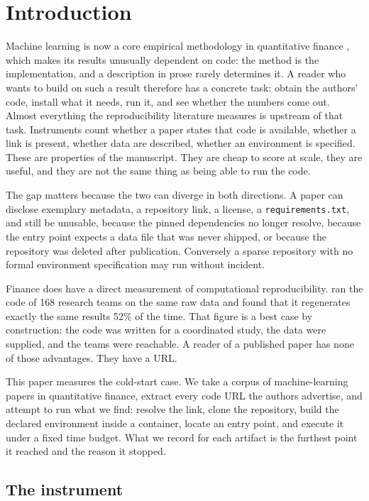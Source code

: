 \section{Introduction}\label{sec:intro}

Machine learning is now a core empirical methodology in quantitative finance
\citep{GuKellyXiu2020}, which makes its results unusually dependent on code: the
method is the implementation, and a description in prose rarely determines it.
A reader who wants to build on such a result therefore has a concrete task:
obtain the authors' code, install what it needs, run it, and see whether the
numbers come out. Almost everything the reproducibility literature measures is
upstream of that task. Instruments count whether a paper states that code is
available, whether a link is present, whether data are described, whether an
environment is specified. These are properties of the manuscript. They are cheap
to score at scale, they are useful, and they are not the same thing as being able
to run the code.

The gap matters because the two can diverge in both directions. A paper can
disclose exemplary metadata, a repository link, a license, a
\texttt{requirements.txt}, and still be unusable, because the pinned dependencies
no longer resolve, because the entry point expects a data file that was never
shipped, or because the repository was deleted after publication. Conversely a
sparse repository with no formal environment specification may run without
incident.

Finance does have a direct measurement of computational reproducibility.
\citet{Perignon2024} ran the code of 168 research teams on the same raw data and
found that it regenerates exactly the same results 52\% of the time. That figure
is a best case by construction: the code was written for a coordinated study, the
data were supplied, and the teams were reachable. A reader of a published paper
has none of those advantages. They have a URL.

This paper measures the cold-start case. We take a corpus of machine-learning papers in
quantitative finance, extract every code URL the authors advertise, and attempt
to run what we find: resolve the link, clone the repository, build the declared
environment inside a container, locate an entry point, and execute it under a
fixed time budget. What we record for each artifact is the furthest point it
reached and the reason it stopped.

\subsection{The instrument}\label{sec:intro_instrument}

